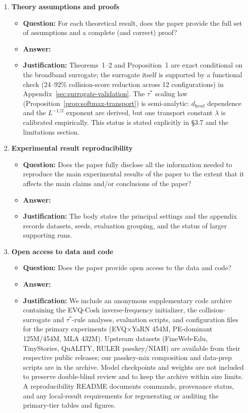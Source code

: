 \documentclass{article}
\begin{document}
\begin{enumerate}
\item \textbf{Theory assumptions and proofs}
\begin{itemize}
\item \textbf{Question:} For each theoretical result, does the paper provide the full set of assumptions and a complete (and correct) proof?
\item \textbf{Answer:} \answerYes{}
\item \textbf{Justification:} Theorems~1--2 and Proposition~1 are exact conditional on the broadband surrogate; the surrogate itself is supported by a functional check (24--92\% collision-score reduction across 12 configurations) in Appendix~\ref{sec:surrogate-validation}. The $\tau^*$ scaling law (Proposition~\ref{prop:softmax-transport}) is semi-analytic: $d_{\mathrm{head}}$ dependence and the $L^{-1/2}$ exponent are derived, but one transport constant $\lambda$ is calibrated empirically. This status is stated explicitly in \S3.7 and the limitations section.
\end{itemize}

\item \textbf{Experimental result reproducibility}
\begin{itemize}
\item \textbf{Question:} Does the paper fully disclose all the information needed to reproduce the main experimental results of the paper to the extent that it affects the main claims and/or conclusions of the paper?
\item \textbf{Answer:} \answerYes{}
\item \textbf{Justification:} The body states the principal settings and the appendix records datasets, seeds, evaluation grouping, and the status of larger supporting runs.
\end{itemize}

\item \textbf{Open access to data and code}
\begin{itemize}
\item \textbf{Question:} Does the paper provide open access to the data and code?
\item \textbf{Answer:} \answerYes{}
\item \textbf{Justification:} We include an anonymous supplementary code archive containing the EVQ-Cosh inverse-frequency initializer, the collision-surrogate and $\tau^*$-rule analyses, evaluation scripts, and configuration files for the primary experiments (EVQ$\times$YaRN 454M, PE-dominant 125M/454M, MLA 432M). Upstream datasets (FineWeb-Edu, TinyStories, QuALITY, RULER passkey/NIAH) are available from their respective public releases; our passkey-mix composition and data-prep scripts are in the archive. Model checkpoints and weights are not included to preserve double-blind review and to keep the archive within size limits. A reproducibility README documents commands, provenance status, and any local-result requirements for regenerating or auditing the primary-tier tables and figures.
\end{itemize}


\end{enumerate}
\end{document}
